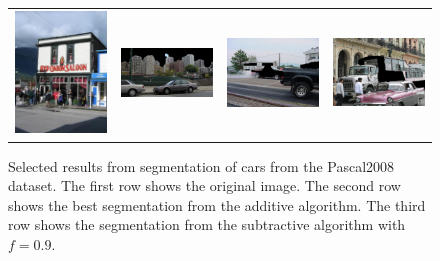 \documentclass[10pt,twocolumn,letterpaper]{article}
\begin{document}
\begin{figure}[p]
\begin{tabular}{ p{4cm} p{4cm} p{4cm} p{4cm} }
\includegraphics[width=3.95cm]{figures/add_res/car/2008_000868.jpg_1_bad.jpg.eps} &
\includegraphics[width=3.95cm]{figures/add_res/car/2008_000884.jpg_1_bad.jpg.eps} &
\includegraphics[width=3.95cm]{figures/add_res/car/2008_001830.jpg_1_bad.jpg.eps} &
\includegraphics[width=3.95cm]{figures/add_res/car/2008_001867.jpg_1_bad.jpg.eps} \\
\end{tabular}
\caption{Selected results from segmentation of cars from the Pascal2008
dataset.  The first row shows the original image.  The second row shows
the best segmentation from the additive algorithm.  The third row shows
the segmentation from the subtractive algorithm with $f=0.9$.}
\label{fig:good_results_car}
\end{figure}
\end{document}
